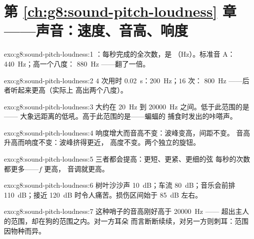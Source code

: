 \section*{第 \ref{ch:g8:sound-pitch-loudness} 章——声音：速度、音高、响度}

\begin{solution}{exo:g8:sound-pitch-loudness:1}
：每秒完成的全次数，是
（\unit{Hz}）。标准音 A：\qty{440}{Hz}；高一个八度：
\qty{880}{Hz} ——翻了一倍。
\end{solution}

\begin{solution}{exo:g8:sound-pitch-loudness:2}
$4$ 次用时 \qty{0.02}{s}：\qty{200}{Hz}；$16$ 次：
\qty{800}{Hz} ——后者听起来更高（实际上
高出两个八度）。
\end{solution}

\begin{solution}{exo:g8:sound-pitch-loudness:3}
大约在 \qty{20}{Hz} 到 \qty{20000}{Hz} 之间。低于此范围的是——
大象远距离的低吼。高于此范围的是——蝙蝠的
捕食时发出的咔嗒声。
\end{solution}

\begin{solution}{exo:g8:sound-pitch-loudness:4}
响度增大而音高不变：波峰变高，间距不变。
音高升高而响度不变：波峰挤得更近，
高度不变。两个独立的旋钮。
\end{solution}

\begin{solution}{exo:g8:sound-pitch-loudness:5}
三者都会提高：更短、更紧、更细的弦
每秒的次数都更多——$f$ 更高，
音调就更高。
\end{solution}

\begin{solution}{exo:g8:sound-pitch-loudness:6}
树叶沙沙声 \qty{10}{dB}；车流 \qty{80}{dB}；音乐会前排
\qty{110}{dB}；接近 \qty{120}{dB} 时令人痛苦。损伤区间始于
\qty{85}{dB} 左右。
\end{solution}

\begin{solution}{exo:g8:sound-pitch-loudness:7}
这种哨子的音高刚好高于 \qty{20000}{Hz} ——
超出主人的范围，却在狗的范围之内。对一方耳朵
而言断断续续，对另一方则刺耳：范围
因物种而异。
\end{solution}

